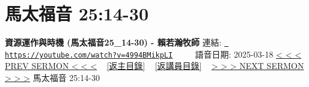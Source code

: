\documentclass{book}
\begin{document}
\section{馬太福音 25:14-30}
\label{sec:4994BMikpLI}
\textbf{資源運作與時機 (馬太福音25\_14-30) - 賴若瀚牧師}
\newline
\newline
連結: \href{https://youtube.com/watch?v=4994BMikpLI}{\texttt{ https://youtube.com/watch?v=4994BMikpLI}} ~~~~ 語音日期: 2025-03-18 
\newline
\newline
\hyperref[sec:srCkvhUNl9w]{< < < PREV SERMON < < <}
~
\hyperlink{toc}{[返主目錄]}
~
\hyperref[ch:preacher12]{[返講員目錄]}
~
\hyperref[sec:lTGVgidxHms]{> > > NEXT SERMON > > >}
\newline
\newline
馬太福音 25:14-30
\newline
\end{document}
